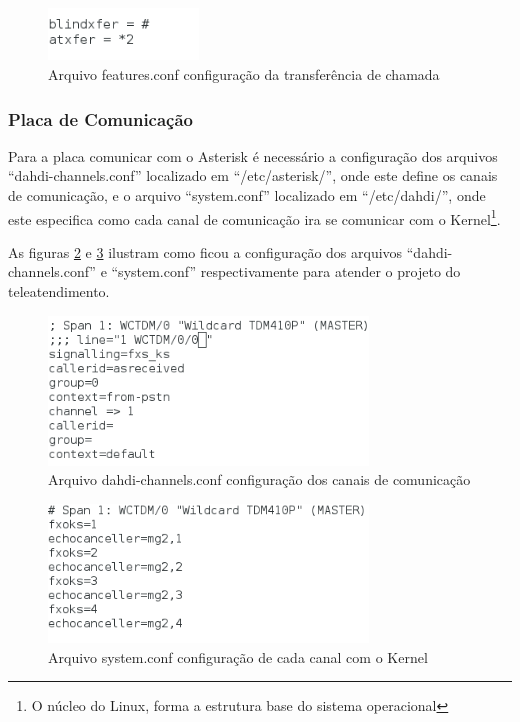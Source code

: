 \begin{figure}[h]
	\centering
	\includegraphics[width=4cm]{imagens/features2.png}
	\caption{Arquivo features.conf configuração da transferência de chamada}
    \label{Figura25}
\end{figure}

\subsubsection{Placa de Comunicação}
Para a placa comunicar com o Asterisk é necessário a configuração dos arquivos ``dahdi-channels.conf'' localizado em ``/etc/asterisk/'', onde este define os canais de comunicação, e o arquivo ``system.conf'' localizado em ``/etc/dahdi/'', onde este especifica como cada canal de comunicação ira se comunicar com o Kernel\footnote{O núcleo do Linux, forma a estrutura base do sistema operacional}.

As figuras \ref{Figura26} e \ref{Figura27} ilustram como ficou a configuração dos arquivos ``dahdi-channels.conf'' e ``system.conf'' respectivamente para atender o projeto do teleatendimento.

\begin{figure}[h]
	\centering
	\includegraphics[width=8.5cm]{imagens/dahdi-chan.png}
	\caption{Arquivo dahdi-channels.conf configuração dos canais de comunicação}
    \label{Figura26}
\end{figure}

\begin{figure}[h]
	\centering
	\includegraphics[width=8.5cm]{imagens/system.png}
	\caption{Arquivo system.conf configuração de cada canal com o Kernel}
    \label{Figura27}
\end{figure}

